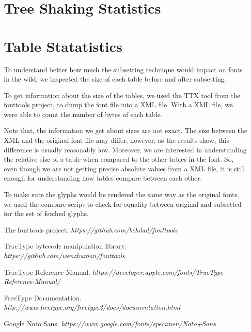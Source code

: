 \documentclass[12pt]{article}
\begin{document}
\clearpage
\begin{appendices}
\section{Tree Shaking Statistics}



\section{Table Statatistics}

To understand better how much the subsetting technique would impact on
fonts in the wild, we inspected the size of each table before and after
subsetting.

To get information about the size of the tables, we used the TTX tool
from the fonttools project, to dump the font file into a XML file. With
a XML file, we were able to count the number of bytes of each table.

Note that, the information we get about sizes are not exact. The size
between the XML and the original font file may differ, however, as the
results show, this difference is usually reasonably low. Moreover, we
are interested in understanding the relative size of a table when
compared to the other tables in the font. So, even though we are not
getting precise absolute values from a XML file, it is still enough for
understanding how tables compare between each other.

To make sure the glyphs would be rendered the same way as the original
fonts, we used the compare script to check for equality between original
and subsetted for the set of fetched glyphs. 



\end{appendices}

\clearpage
\begin{thebibliography}{1}

 The fonttools project. {\em https://github.com/behdad/fonttools } 

 TrueType bytecode manipulation library. 
{\em https://github.com/wenzhuman/fonttools } 

 TrueType Reference Manual. 
{\em https://developer.apple.com/fonts/TrueType-Reference-Manual/ } 

 FreeType Documentation.
{\em http://www.freetype.org/freetype2/docs/documentation.html }

 Google Noto Sans. 
{\em https://www.google.com/fonts/specimen/Noto+Sans } 

\end{thebibliography}
\end{document}
